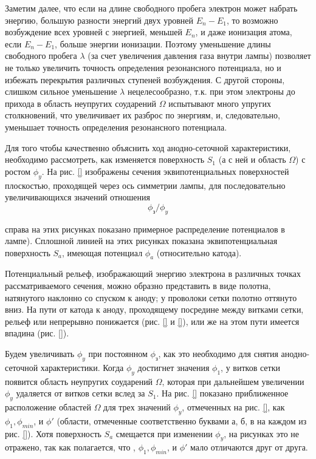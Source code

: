 Заметим далее, что если на длине свободного пробега электрон может набрать энергию, большую разности энергий двух уровней $E_n-E_1$, то возможно возбуждение всех уровней с энергией, меньшей $E_n$, и даже ионизация атома, если $E_n-E_1$, больше энергии ионизации. Поэтому уменьшение длины свободного пробега $\lambda$ (за счет увеличения давления газа внутри лампы) позволяет не только увеличить точность определения резонансного потенциала, но и избежать перекрытия различных ступеней возбуждения. С другой стороны, слишком сильное уменьшение $\lambda$ нецелесообразно, т.к. при этом электроны до прихода в область неупругих соударений $\Omega$ испытывают много упругих столкновений, что увеличивает их разброс по энергиям, и, следовательно, уменьшает точность определения резонансного потенциала.

Для того чтобы качественно объяснить ход анодно-сеточной характеристики, необходимо рассмотреть, как изменяется поверхность $S_1$ (а с ней и область $\Omega$) с ростом $\phi_y$. На рис. \ref{} изображены сечения эквипотенциальных поверхностей плоскостью, проходящей через ось симметрии лампы, для последовательно увеличивающихся значений отношения \[\phi_\text{з}/\phi_y\] {справа на этих рисунках показано примерное распределение потенциалов в лампе). Сплошной линией на этих рисунках показана эквипотенциальная поверхность $S_a$, имеющая потенциал $\phi_a$ (относительно катода).

Потенциальный рельеф, изображающий энергию электрона в различных точках рассматриваемого сечения, можно образно представить в виде полотна, натянутого наклонно со спуском к аноду; у проволоки сетки полотно оттянуто вниз. На пути от катода к аноду, проходящему посредине между витками сетки, рельеф или непрерывно понижается (рис. \ref{} и \ref{}), или же на этом пути имеется впадина (рис. \ref{}).

Будем увеличивать $\phi_y$ при постоянном $\phi_\text{з}$, как это необходимо для снятия анодно-сеточной характеристики. Когда $\phi_y$ достигнет значения $\phi_1$, у витков сетки появится область неупругих соударений $\Omega$, которая при дальнейшем увеличении $\phi_y$ удаляется от витков сетки вслед за $S_1$. На рис. \ref{} показано приближенное расположение областей $\Omega$ для трех значений $\phi_y$, отмеченных на рис. \ref{}, как $\phi_1, \phi_{min}$, и $\phi'$ (области, отмеченные соответственно буквами а, б, в на каждом из рис. \ref{}). Хотя поверхность $S_a$ смещается при изменении $\phi_y$, на рисунках это не отражено, так как полагается, что , $\phi_1, \phi_{min}$, и $\phi'$ мало отличаются друг от друга.

}
